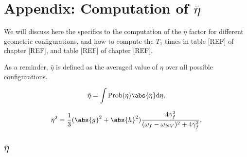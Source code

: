 \documentclass[a4paper,11pt]{report}
\title{}
\begin{document}
\chapter{Appendix: Computation of $\bar \eta$}
We will discuss here the specifics to the computation of the  $\bar \eta$ factor for different geometric configurations, and how to compute the $T_1$ times in table [REF] of chapter [REF], and table [REF] of chapter [REF].

As a reminder, $\bar \eta$ is defined as the averaged value of $\eta$ over all possible configurations.

\begin{equation}
\bar \eta = \int \rm{Prob}(\eta) \abs{\eta} d\eta,
\end{equation}

\begin{equation}
\eta^2=\frac{1}{3} (\abs{g}^2+\abs{h}^2)  \frac{4\gamma_f^2}{(\omega_f - \omega_{NV})^2+4\gamma_f^2},
\end{equation}

\section{$\bar \eta$}


\printbibliography
\end{document}
